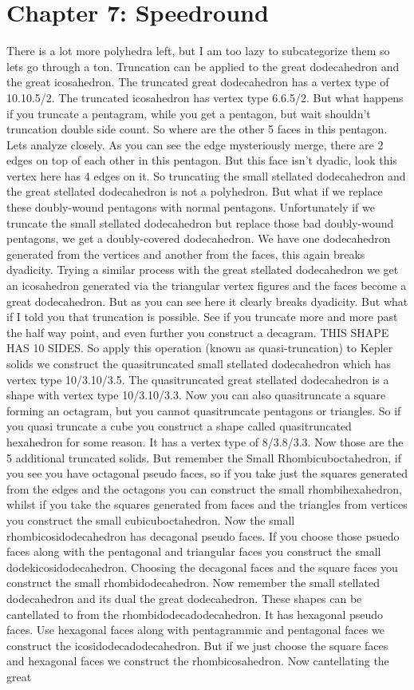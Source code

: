 \documentclass{article}
\begin{document}
\section*{Chapter 7: Speedround}
There is a lot more polyhedra left, but I am too lazy to subcategorize them so lets go through a ton. Truncation can be applied to the great dodecahedron and the great icosahedron. The truncated great dodecahedron has a vertex type of 10.10.5/2. The truncated icosahedron has vertex type 6.6.5/2. But what happens if you truncate a pentagram, while you get a pentagon, but wait shouldn't truncation double side count. So where are the other 5 faces in this pentagon. Lets analyze closely. As you can see the edge mysteriously merge, there are 2 edges on top of each other in this pentagon. But this face isn't dyadic, look this vertex here has 4 edges on it. So truncating the small stellated dodecahedron and the great stellated dodecahedron is not a polyhedron. But what if we replace these doubly-wound pentagons with normal pentagons. Unfortunately if we truncate the small stellated dodecahedron but replace those bad doubly-wound pentagons, we get a doubly-covered dodecahedron. We have one dodecahedron generated from the vertices and another from the faces, this again breaks dyadicity. Trying a similar process with the great stellated dodecahedron we get an icosahedron generated via the triangular vertex figures and the faces become a great dodecahedron. But as you can see here it clearly breaks dyadicity. But what if I told you that truncation is possible. See if you truncate more and more past the half way point, and even further you construct a decagram. THIS SHAPE HAS 10 SIDES. So apply this operation (known as quasi-truncation) to Kepler solids we construct the quasitruncated small stellated dodecahedron which has vertex type 10/3.10/3.5. The quasitruncated great stellated dodecahedron is a shape with vertex type 10/3.10/3.3. Now you can also quasitruncate a square forming an octagram, but you cannot quasitruncate pentagons or triangles. So if you quasi truncate a cube you construct a shape called quasitruncated hexahedron for some reason. It has a vertex type of 8/3.8/3.3. Now those are the 5 additional truncated solids. But remember the Small Rhombicuboctahedron, if you see you have octagonal pseudo faces, so if you take just the squares generated from the edges and the octagons you can construct the small rhombihexahedron, whilst if you take the squares generated from faces and the triangles from vertices you construct the small cubicuboctahedron. Now the small rhombicosidodecahedron has decagonal pseudo faces. If you choose those psuedo faces along with the pentagonal and triangular faces you construct the small dodekicosidodecahedron. Choosing the decagonal faces and the square faces you construct the small rhombidodecahedron. Now remember the small stellated dodecahedron and its dual the great dodecahedron. These shapes can be cantellated to from the rhombidodecadodecahedron. It has hexagonal pseudo faces. Use hexagonal faces along with pentagrammic and pentagonal faces we construct the icosidodecadodecahedron. But if we just choose the square faces and hexagonal faces we construct the rhombicosahedron.  Now cantellating the great 
\end{document}
